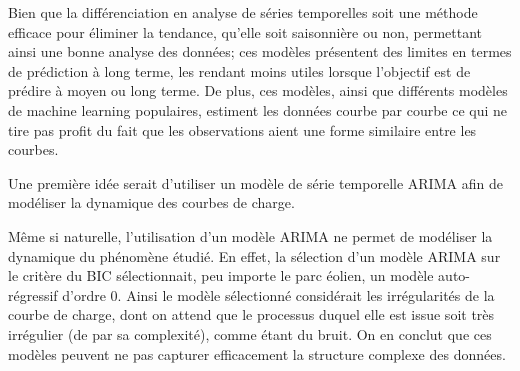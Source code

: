 Bien que la différenciation en analyse de séries temporelles soit une méthode efficace pour éliminer la tendance, qu'elle soit saisonnière ou non, permettant ainsi une bonne analyse des données; ces modèles présentent des limites en termes de prédiction à long terme, les rendant moins utiles lorsque l'objectif est de prédire à moyen ou long terme. De plus, ces modèles, ainsi que différents modèles de machine learning populaires, estiment les données courbe par courbe ce qui ne tire pas profit du fait que les observations aient une forme similaire entre les courbes.

\smallskip

Une première idée serait d'utiliser un modèle de série temporelle ARIMA afin de modéliser la dynamique des courbes de charge.





Même si naturelle, l'utilisation d'un modèle ARIMA ne permet de modéliser la dynamique du phénomène étudié. En effet, la sélection d'un modèle ARIMA sur le critère du BIC sélectionnait, peu importe le parc éolien, un modèle auto-régressif d'ordre 0. Ainsi le modèle sélectionné considérait les irrégularités de la courbe de charge, dont on attend que le processus duquel elle est issue soit très irrégulier (de par sa complexité), comme étant du bruit. On en conclut que ces modèles peuvent ne pas capturer efficacement la structure complexe des données.